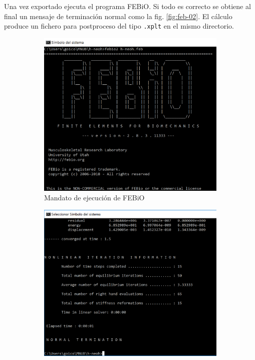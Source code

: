 Una vez exportado ejecuta el programa FEBiO. %
Si todo es correcto se obtiene al final un mensaje de terminación normal como la fig. \ref{fig:feb-02}.
El cálculo produce un fichero para postproceso del tipo \texttt{.xplt} en el mismo directorio.
\begin{figure}[!htp]
\centering
\begin{subfigure}[b]{0.48\textwidth}
\centering
\includegraphics[width=\textwidth]{figuras_3/scr-feb-01.png}
\caption{Mandato de ejecución de FEBiO}
\label{fig:feb-01}
\end{subfigure}
\begin{subfigure}[b]{0.48\textwidth}
\centering
\includegraphics[width=\textwidth]{figuras_3/scr-feb-02.png}

\end{subfigure}
\end{figure}
